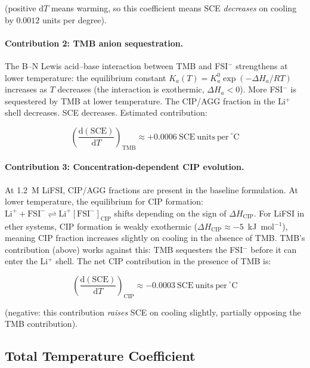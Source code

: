 \documentclass[11pt]{article}
\theoremstyle{plain}
\theoremstyle{definition}
\theoremstyle{remark}
\begin{document}
(positive $\mathrm{d}T$ means warming, so this coefficient means
SCE \emph{decreases} on cooling by $0.0012$ units per degree).

\paragraph{Contribution 2: TMB anion sequestration.}

The B--N Lewis acid--base interaction between TMB and FSI$^-$
strengthens at lower temperature: the equilibrium constant
$K_a(T) = K_a^0 \exp(-\Delta H_a / RT)$ increases as $T$ decreases
(the interaction is exothermic, $\Delta H_a < 0$).  More FSI$^-$ is
sequestered by TMB at lower temperature.  The CIP/AGG fraction in
the Li$^+$ shell decreases.  SCE decreases.  Estimated contribution:

\begin{equation}
  \left(\frac{\mathrm{d}(\mathrm{SCE})}{\mathrm{d}T}
  \right)_\mathrm{TMB} \approx +0.0006~\mathrm{SCE~units~per~}
  ^\circ\mathrm{C}
  \label{eq:coeff_TMB}
\end{equation}

\paragraph{Contribution 3: Concentration-dependent CIP evolution.}

At 1.2~M LiFSI, CIP/AGG fractions are present in the baseline
formulation.  At lower temperature, the equilibrium for CIP
formation:
$\mathrm{Li}^+ + \mathrm{FSI}^- \rightleftharpoons
\mathrm{Li}^+[\mathrm{FSI}^-]_\mathrm{CIP}$
shifts depending on the sign of $\Delta H_\mathrm{CIP}$.  For
LiFSI in ether systems, CIP formation is weakly exothermic
($\Delta H_\mathrm{CIP} \approx -5$~kJ~mol$^{-1}$), meaning
CIP fraction increases slightly on cooling in the absence of TMB.
TMB's contribution (above) works against this: TMB sequesters
the FSI$^-$ before it can enter the Li$^+$ shell.  The net CIP
contribution in the presence of TMB is:

\begin{equation}
  \left(\frac{\mathrm{d}(\mathrm{SCE})}{\mathrm{d}T}
  \right)_\mathrm{CIP} \approx -0.0003~\mathrm{SCE~units~per~}
  ^\circ\mathrm{C}
  \label{eq:coeff_CIP}
\end{equation}

(negative: this contribution \emph{raises} SCE on cooling slightly,
partially opposing the TMB contribution).

\subsection{Total Temperature Coefficient}
\end{document}
